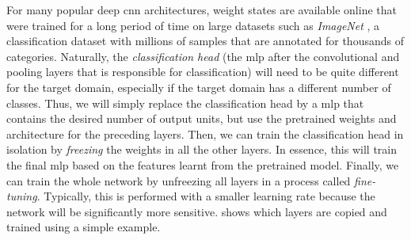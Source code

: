 \documentclass[../main.tex]{subfiles}
\begin{document}
For many popular deep \gls{cnn} architectures, weight states are available online that were trained for a long period of time on large datasets such as \emph{ImageNet} \cite{deng2009}, a classification dataset with millions of samples that are annotated for thousands of categories.
Naturally, the \emph{classification head} (the \gls{mlp} after the convolutional and pooling layers that is responsible for classification) will need to be quite different for the target domain, especially if the target domain has a different number of classes.
Thus, we will simply replace the classification head by a \gls{mlp} that contains the desired number of output units, but use the pretrained weights and architecture for the preceding layers.
Then, we can train the classification head in isolation by \emph{freezing} the weights in all the other layers.
In essence, this will train the final \gls{mlp} based on the features learnt from the pretrained model.
Finally, we can train the whole network by unfreezing all layers in a process called \emph{fine-tuning}.
Typically, this is performed with a smaller learning rate because the network will be significantly more sensitive.
 shows which layers are copied and trained using a simple example.
\end{document}
